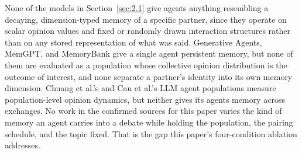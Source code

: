 \documentclass[11pt,a4paper]{article}
\begin{document}
None of the models in Section~\ref{sec:2.1} give agents anything resembling a decaying, dimension-typed memory of a specific partner, since they operate on scalar opinion values and fixed or randomly drawn interaction structures rather than on any stored representation of what was said. Generative Agents, MemGPT, and MemoryBank give a single agent persistent memory, but none of them are evaluated as a population whose collective opinion distribution is the outcome of interest, and none separate a partner's identity into its own memory dimension. Chuang et al.'s and Cau et al.'s LLM agent populations measure population-level opinion dynamics, but neither gives its agents memory across exchanges. No work in the confirmed sources for this paper varies the kind of memory an agent carries into a debate while holding the population, the pairing schedule, and the topic fixed. That is the gap this paper's four-condition ablation addresses.

%
\end{document}
